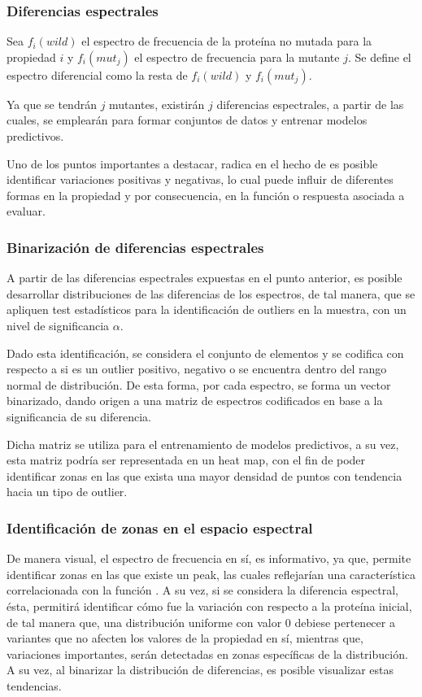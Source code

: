 \subsubsection{Diferencias espectrales}
 
Sea $f_i(wild)$ el espectro de frecuencia de la proteína no mutada para la propiedad $i$ y $f_i(mut_{j})$ el espectro de frecuencia para la mutante $j$. Se define el espectro diferencial como la resta de $f_i(wild)$ y $f_i(mut_{j})$.

Ya que se tendrán $j$ mutantes, existirán $j$ diferencias espectrales, a partir de las cuales, se emplearán para formar conjuntos de datos y entrenar modelos predictivos.

Uno de los puntos importantes a destacar, radica en el hecho de es posible identificar variaciones positivas y negativas, lo cual puede influir de diferentes formas en la propiedad y por consecuencia, en la función o respuesta asociada a evaluar.

\subsubsection{Binarización de diferencias espectrales}

A partir de las diferencias espectrales expuestas en el punto anterior, es posible desarrollar distribuciones de las diferencias de los espectros, de tal manera, que se apliquen test estadísticos para la identificación de outliers en la muestra, con un nivel de significancia $\alpha$.

Dado esta identificación, se considera el conjunto de elementos y se codifica con respecto a si es un outlier positivo, negativo o se encuentra dentro del rango normal de distribución. De esta forma, por cada espectro, se forma un vector binarizado, dando origen a una matriz de espectros codificados en base a la significancia de su diferencia.

Dicha matriz se utiliza para el entrenamiento de modelos predictivos, a su vez, esta matriz podría ser representada en un heat map, con el fin de poder identificar zonas en las que exista una mayor densidad de puntos con tendencia hacia un tipo de outlier.

\subsubsection{Identificación de zonas en el espacio espectral}

De manera visual, el espectro de frecuencia en sí, es informativo, ya que, permite identificar zonas en las que existe un peak, las cuales reflejarían una característica correlacionada con la función \cite{vijayakumar1998electrostatic}. A su vez, si se considera la diferencia espectral, ésta, permitirá identificar cómo fue la variación con respecto a la proteína inicial, de tal manera que, una distribución uniforme con valor 0 debiese pertenecer a variantes que no afecten los valores de la propiedad en sí, mientras que, variaciones importantes, serán detectadas en zonas específicas de la distribución. A su vez, al binarizar la distribución de diferencias, es posible visualizar estas tendencias. 


